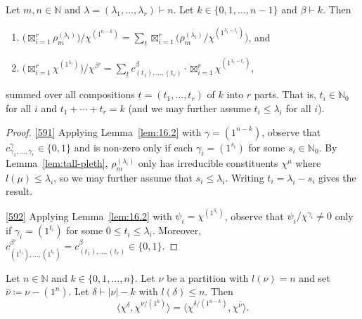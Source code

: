 \documentclass[ALCO, Unicode]{cedram}
\newcommand{\N}{\mathbb{N}}
\begin{document}
\begin{corollary}\label{cor:16.2}
	Let $m,n\in\N$ and $\lambda=(\lambda_1,\dotsc,\lambda_r)\vdash n$. Let $k\in\{0,1,\dotsc,n-1\}$ and $\beta\vdash k$. Then
	\begin{enumerate}[label=\textup{(\roman*)}]
		\item \label{591} $\big(\operatorname*{\boxtimes}_{i=1}^r \rho^{(\lambda_i)}_m \big)/\chi^{(1^{n-k})} = \sum_{\underline{t}}  \operatorname*{\boxtimes}_{i=1}^r \big( \rho^{(\lambda_i)}_m/\chi^{(1^{\lambda_i-t_i})} \big)$, and
		
		\item \label{592} $\big( \operatorname*{\boxtimes}_{i=1}^r \chi^{(1^{\lambda_i})} \big)/\chi^{\beta'} = \sum_{\underline{t}} c^\beta_{(t_1),\dotsc,(t_r)}\cdot \operatorname*{\boxtimes}_{i=1}^r \chi^{(1^{\lambda_i-t_i})}$,
	\end{enumerate}
	summed over all compositions $\underline{t}=(t_1,\dotsc,t_r)$ of $k$ into $r$ parts. That is, $t_i\in\N_0$ for all $i$ and $t_1+\cdots+t_r=k$ \textup{(}and we may further assume $t_i\le\lambda_i$ for all $i$\textup{)}.
\end{corollary}

\begin{proof}
	\ref{591} Applying Lemma~\ref{lem:16.2} with $\gamma=(1^{n-k})$, observe that $c^\gamma_{\gamma_1,\dotsc,\gamma_r}\in\{0,1\}$ and is non-zero only if each $\gamma_i=(1^{s_i})$ for some $s_i\in\N_0$. By Lemma~\ref{lem:tall-pleth}, $\rho^{(\lambda_i)}_m$ only has irreducible constituents $\chi^\mu$ where $l(\mu)\le \lambda_i$, so we may further assume that $s_i\le\lambda_i$. Writing $t_i=\lambda_i-s_i$ gives the result.
	
	\noindent \ref{592} Applying Lemma~\ref{lem:16.2} with $\psi_i=\chi^{(1^{\lambda_i})}$, observe that $\psi_i/\chi^{\gamma_i}\ne 0$ only if $\gamma_i=(1^{t_i})$ for some $0\le t_i\le \lambda_i$. Moreover, $c^{\beta'}_{(1^{t_1}),\dotsc,(1^{t_r})}=c^\beta_{(t_1),\dotsc,(t_r)}\in\{0,1\}$.
\end{proof}

\begin{lemma}\label{lem:16.3}
	Let $n\in\N$ and $k\in\{0,1,\dotsc,n\}$. Let $\nu$ be a partition with $l(\nu)=n$ and set $\hat{\nu}\coloneqq \nu-(1^n)$. Let $\delta\vdash|\nu|-k$ with $l(\delta)\le n$. Then
	\[ \langle\chi^\delta,\chi^{\nu/(1^k)} \rangle = \langle \chi^{\delta/(1^{n-k})},\chi^{\hat{\nu}}\rangle. \]
\end{lemma}
\end{document}
